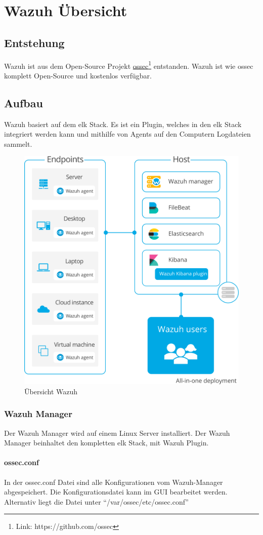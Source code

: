 \chapter{Wazuh Übersicht}
\section{Entstehung}
Wazuh ist aus dem Open-Source Projekt \href{https://github.com/ossec}{ossec}\footnote{Link: https://github.com/ossec} entstanden.
Wazuh ist wie ossec komplett Open-Source und kostenlos verfügbar.

\section{Aufbau}
Wazuh basiert auf dem \acrfull{elk} Stack. 
Es ist ein Plugin, welches in den \acrshort{elk} Stack integriert werden kann und mithilfe von Agents auf den Computern Logdateien sammelt.

\begin{figure}[H]
    \centering
    \includegraphics[width=0.5\linewidth]{../img/aufbau-wazuh.png}
    \caption[Übersicht Wazuh]{Übersicht Wazuh\footnotemark}
\end{figure}


\subsection{Wazuh Manager}
Der Wazuh Manager wird auf einem Linux Server installiert.
Der Wazuh Manager beinhaltet den kompletten \acrshort{elk} Stack, mit Wazuh Plugin. 

\subsubsection{ossec.conf}
In der ossec.conf Datei sind alle Konfigurationen vom Wazuh-Manager abgespeichert.
Die Konfigurationsdatei kann im GUI bearbeitet werden. Alternativ liegt die Datei unter ``/var/ossec/etc/ossec.conf''


